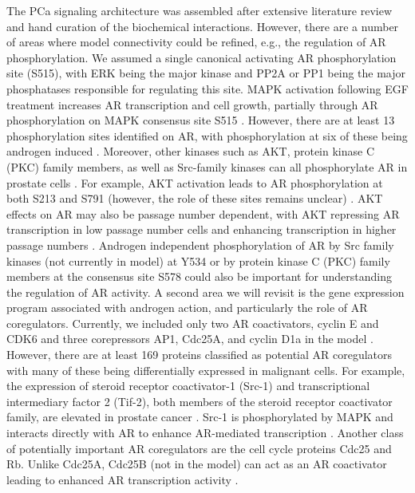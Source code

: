 \documentclass[12pt]{article}
\begin{document}
The PCa signaling architecture was assembled after extensive literature review and hand curation of the biochemical interactions.
However, there are a number of areas where model connectivity could be refined, e.g., the regulation of AR phosphorylation.
We assumed a single canonical activating AR phosphorylation site (S515), with ERK being the major kinase and PP2A or PP1 being the major phosphatases responsible for regulating this site.  
MAPK activation following EGF treatment increases AR transcription and cell growth, partially through AR phosphorylation on MAPK consensus site S515 \cite{Ponguta2008}.
However, there are at least 13 phosphorylation sites identified on AR, with phosphorylation at six of these being androgen induced \cite{Gioeli2012}. 
Moreover, other kinases such as AKT, protein kinase C (PKC) family members, as well as Src-family kinases can all phosphorylate AR in prostate cells \cite{Guo2006,Ponguta2008}. 
For example, AKT activation leads to AR  phosphorylation at both S213 and S791 (however, the role of these sites remains unclear) \cite{Wen2000,Lin2001PNAS,Taneja2005,Lin2003}.  
AKT effects on AR may also be passage number dependent, with AKT repressing AR transcription in low passage number cells and enhancing transcription in higher passage numbers \cite{Lin2003}. 
Androgen independent phosphorylation of AR by Src family kinases (not currently in model) at Y534 \cite{Guo2006} or by protein kinase C (PKC) family members at the consensus site S578 could also be important for understanding the regulation of AR activity. 
A second area we will revisit is the gene expression program associated with androgen action, and particularly the role of AR coregulators.
Currently, we included only two AR coactivators, cyclin E and CDK6 \cite{Yamamoto2000,Lim2005} and three corepressors AP1, Cdc25A, and cyclin D1a in the model \cite{Sato1997,Chiu2009,Petre-Draviam2003}. 
However, there are at least 169 proteins classified as potential AR coregulators \cite{Heinlein:2002qy,Heemers2007} with many of these being differentially expressed in malignant cells.
For example, the expression of steroid receptor coactivator-1 (Src-1) and transcriptional intermediary factor 2 (Tif-2), both members of the steroid receptor coactivator family, are elevated in prostate cancer \cite{Gregory2001,Gregory2004}. 
Src-1 is phosphorylated by MAPK and interacts directly with AR to enhance AR-mediated transcription \cite{Heemers2007}. 
Another class of potentially important AR coregulators are the cell cycle proteins Cdc25 and Rb.
Unlike Cdc25A, Cdc25B (not in the model) can act as an AR coactivator leading to enhanced AR transcription activity \cite{Ngan2003}. 
\end{document}

